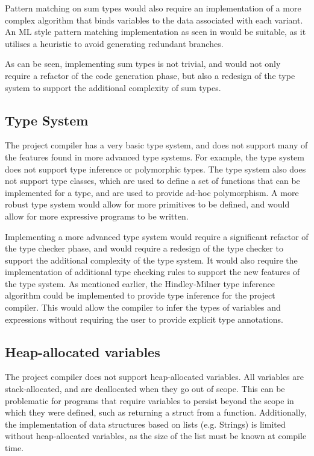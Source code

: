Pattern matching on sum types would also require an implementation of a more complex algorithm that
binds variables to the data associated with each variant. An ML style pattern matching
implementation as seen in \autocite{jacobs2021pattern} would be suitable, as it utilises a heuristic
to avoid generating redundant branches.

As can be seen, implementing sum types is not trivial, and would not only require a refactor of the
code generation phase, but also a redesign of the type system to support the additional complexity
of sum types.

\subsection{Type System}

The project compiler has a very basic type system, and does not support many of the features found
in more advanced type systems. For example, the type system does not support type inference or
polymorphic types. The type system also does not support type classes, which are used to define a
set of functions that can be implemented for a type, and are used to provide ad-hoc polymorphism.
A more robust type system would allow for more primitives to be defined, and would allow for more
expressive programs to be written.

Implementing a more advanced type system would require a significant refactor of the type checker
phase, and would require a redesign of the type checker to support the additional complexity of the
type system. It would also require the implementation of additional type checking rules to support
the new features of the type system. As mentioned earlier, the Hindley-Milner type inference
algorithm could be implemented to provide type inference for the project compiler. This would allow
the compiler to infer the types of variables and expressions without requiring the user to provide
explicit type annotations.

\subsection{Heap-allocated variables}

The project compiler does not support heap-allocated variables. All variables are stack-allocated,
and are deallocated when they go out of scope. This can be problematic for programs that require
variables to persist beyond the scope in which they were defined, such as returning a struct from a
function. Additionally, the implementation of data structures based on lists (e.g. Strings) is
limited without heap-allocated variables, as the size of the list must be known at compile time.

